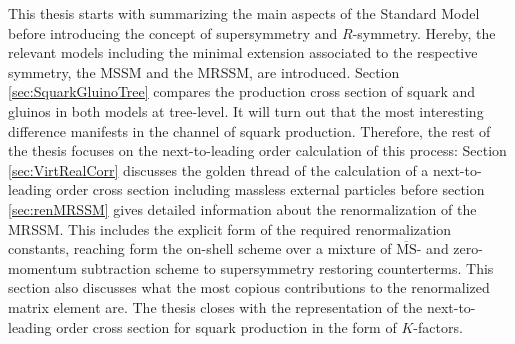 This thesis starts with summarizing the main aspects of the Standard Model before introducing the concept of supersymmetry and $R$-symmetry. Hereby, the relevant models including the minimal extension associated to the respective symmetry, the MSSM and the MRSSM, are introduced. Section \ref{sec:SquarkGluinoTree} compares the production cross section of squark and gluinos in both models at \mbox{tree-level}. It will turn out that the most interesting difference manifests in the channel of squark production. Therefore, the rest of the thesis focuses on the next-to-leading order calculation of this process: Section \ref{sec:VirtRealCorr} discusses the golden thread of the calculation of a next-to-leading order cross section including massless external particles before section \ref{sec:renMRSSM} gives detailed information about the renormalization of the MRSSM. This includes the explicit form of the required renormalization constants, reaching form the on-shell scheme over a mixture of $\overline{\mathrm{MS}}$- and zero-momentum subtraction scheme to supersymmetry restoring counterterms. This section also discusses what the most copious contributions to the renormalized matrix element are. The thesis closes with the representation of the next-to-leading order cross section for squark production in the form of $K$-factors.

